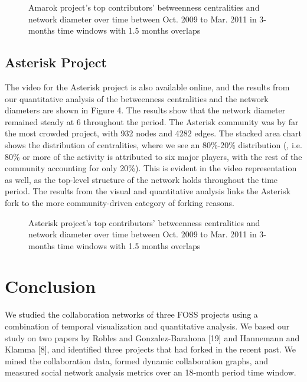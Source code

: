 \documentclass[ifip]{svmult}
\begin{document}
\begin{figure}[!Htbp]
\centering
{}
\justifying
{}
\caption{Amarok project's top contributors' betweenness centralities and network diameter over time between Oct. 2009 to Mar. 2011 in 3-months time windows with 1.5 months overlaps}
\end{figure}

\subsection{Asterisk Project}
The video for the Asterisk project is also available online, and the results from our quantitative analysis of the betweenness centralities and the network diameters are shown in Figure 4. The results show that the network diameter remained steady at 6 throughout the period. The Asterisk community was by far the most crowded project, with 932 nodes and 4282 edges. The stacked area chart shows the distribution of centralities, where we see an 80\%-20\% distribution (, i.e. 80\% or more of the activity is attributed to six major players, with the rest of the community accounting for only 20\%). This is evident in the video representation as well, as the top-level structure of the network holds throughout the time period. The results from the visual and quantitative analysis links the Asterisk fork to the more community-driven category of forking reasons.

\begin{figure}[!Htbp]
\label{Asterisk_chart}
\centering
{}
\justifying
{}
\caption{Asterisk project's top contributors' betweenness centralities and network diameter over time between Oct. 2009 to Mar. 2011 in 3-months time windows with 1.5 months overlaps}
\end{figure}
\section{Conclusion}
We studied the collaboration networks of three FOSS projects using a combination of temporal visualization and quantitative analysis. We based our study on two papers by Robles and Gonzalez-Barahona [19] and Hannemann and Klamma [8], and identified three projects that had forked in the recent past. We mined the collaboration data, formed dynamic collaboration graphs, and measured social network analysis metrics over an 18-month period time window. 
\end{document}
